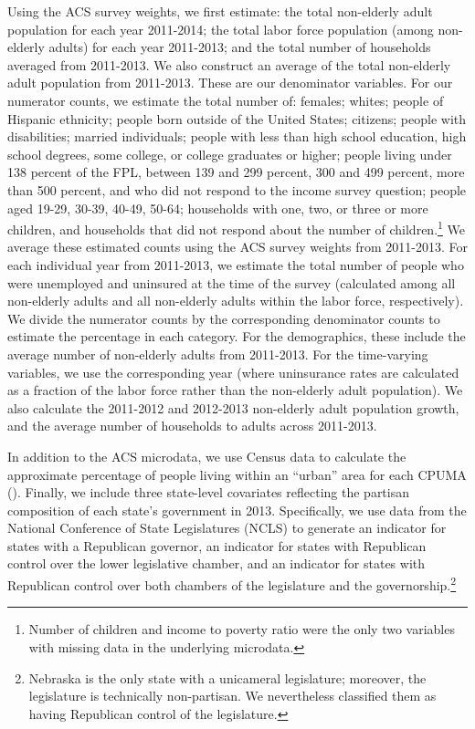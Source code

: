 \documentclass[12pt]{article}
\begin{document}
Using the ACS survey weights, we first estimate: the total non-elderly adult population for each year 2011-2014; the total labor force population (among non-elderly adults) for each year 2011-2013; and the total number of households averaged from 2011-2013. We also construct an average of the total non-elderly adult population from 2011-2013. These are our denominator variables. For our numerator counts, we estimate the total number of: females; whites; people of Hispanic ethnicity; people born outside of the United States; citizens; people with disabilities; married individuals; people with less than high school education, high school degrees, some college, or college graduates or higher; people living under 138 percent of the FPL, between 139 and 299 percent, 300 and 499 percent, more than 500 percent, and who did not respond to the income survey question; people aged 19-29, 30-39, 40-49, 50-64; households with one, two, or three or more children, and households that did not respond about the number of children.\footnote{Number of children and income to poverty ratio were the only two variables with missing data in the underlying microdata.} We average these estimated counts using the ACS survey weights from 2011-2013. For each individual year from 2011-2013, we estimate the total number of people who were unemployed and uninsured at the time of the survey (calculated among all non-elderly adults and all non-elderly adults within the labor force, respectively). We divide the numerator counts by the corresponding denominator counts to estimate the percentage in each category. For the demographics, these include the average number of non-elderly adults from 2011-2013. For the time-varying variables, we use the corresponding year (where uninsurance rates are calculated as a fraction of the labor force rather than the non-elderly adult population). We also calculate the 2011-2012 and 2012-2013 non-elderly adult population growth, and the average number of households to adults across 2011-2013. 

In addition to the ACS microdata, we use Census data to calculate the approximate percentage of people living within an ``urban'' area for each CPUMA (\cite{census}). Finally, we include three state-level covariates reflecting the partisan composition of each state's government in 2013. Specifically, we use data from the National Conference of State Legislatures (NCLS) to generate an indicator for states with a Republican governor, an indicator for states with Republican control over the lower legislative chamber, and an indicator for states with Republican control over both chambers of the legislature and the governorship.\footnote{Nebraska is the only state with a unicameral legislature; moreover, the legislature is technically non-partisan. We nevertheless classified them as having Republican control of the legislature.} 
\end{document}
